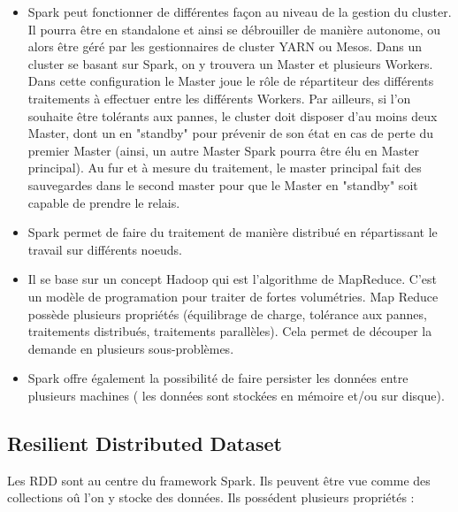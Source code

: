 \begin{itemize}
  \item Spark peut fonctionner de différentes façon au niveau de la gestion du cluster. Il pourra être en standalone et ainsi se débrouiller de manière autonome, ou alors être géré par les gestionnaires de cluster YARN ou Mesos. Dans un cluster se basant sur Spark, on y trouvera un Master et plusieurs Workers. 
  Dans cette configuration le Master joue le rôle de répartiteur des différents traitements à effectuer entre les différents Workers. Par ailleurs, si l'on souhaite être tolérants aux pannes, le cluster doit disposer d'au moins deux Master, dont un en "standby" pour prévenir de son état en cas de perte du premier Master (ainsi, un autre Master Spark pourra être élu en Master principal). 
  Au fur et à mesure du traitement, le master principal fait des sauvegardes dans le second master pour que le Master en "standby" soit capable de prendre le relais.
  \item Spark permet de faire du traitement de manière distribué en répartissant le travail sur différents noeuds.
  \item Il se base sur un concept Hadoop qui est l'algorithme de MapReduce. C'est un modèle de programation pour traiter de fortes volumétries. Map Reduce possède plusieurs propriétés (équilibrage de charge, tolérance aux pannes, traitements distribués, traitements parallèles). Cela permet de découper la demande en plusieurs sous-problèmes.
  \item Spark offre également la possibilité de faire persister les données entre plusieurs machines ( les données sont stockées en mémoire et/ou sur disque).
\end{itemize}

\subsection{Resilient Distributed Dataset}

Les RDD sont au centre du framework Spark. Ils peuvent être vue comme des collections oû l'on y stocke des données. Ils possédent plusieurs propriétés :


